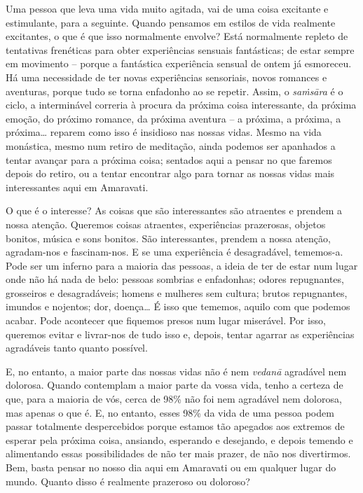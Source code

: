 Uma pessoa que leva uma vida muito agitada, vai de uma coisa excitante e
estimulante, para a seguinte. Quando pensamos em estilos de vida realmente
excitantes, o que é que isso normalmente envolve? Está normalmente repleto de
tentativas frenéticas para obter experiências sensuais fantásticas; de estar
sempre em movimento -- porque a fantástica experiência sensual de ontem já
esmoreceu. Há uma necessidade de ter novas experiências sensoriais, novos
romances e aventuras, porque tudo se torna enfadonho ao se repetir. Assim,
o \emph{saṁsāra} é o ciclo, a interminável correria à procura da próxima coisa
interessante, da próxima emoção, do próximo romance, da próxima aventura -- a
próxima, a próxima, a próxima\ldots{} reparem como isso é insidioso nas nossas
vidas. Mesmo na vida monástica, mesmo num retiro de meditação, ainda podemos ser
apanhados a tentar avançar para a próxima coisa; sentados aqui a pensar no que
faremos depois do retiro, ou a tentar encontrar algo para tornar as nossas vidas
mais interessantes aqui em Amaravati.

O que é o interesse? As coisas que são interessantes são atraentes e prendem a
nossa atenção. Queremos coisas atraentes, experiências prazerosas, objetos
bonitos, música e sons bonitos. São interessantes, prendem a nossa atenção,
agradam-nos e fascinam-nos. E se uma experiência é desagradável, tememos-a. %
Pode ser um inferno para a maioria das pessoas, a ideia de ter de estar num
lugar onde não há nada de belo: pessoas sombrias e enfadonhas; odores
repugnantes, grosseiros e desagradáveis; homens e mulheres sem cultura; brutos
repugnantes, imundos e nojentos; dor, doença\ldots{} É isso que tememos, aquilo
com que podemos acabar. Pode acontecer que fiquemos presos num lugar miserável.
Por isso, queremos evitar e livrar-nos de tudo isso e, depois, tentar agarrar
as experiências agradáveis tanto quanto possível.

E, no entanto, a maior parte das nossas vidas não é nem \emph{vedanā} agradável
nem dolorosa. Quando contemplam a maior parte da vossa vida, tenho a certeza de
que, para a maioria de vós, cerca de 98\% não foi nem agradável nem dolorosa,
mas apenas o que é. E, no entanto, esses 98\% da vida de uma pessoa podem passar
totalmente despercebidos porque estamos tão apegados aos extremos de esperar
pela próxima coisa, ansiando, esperando e desejando, e depois temendo e
alimentando essas possibilidades de não ter mais prazer, de não nos divertirmos.
Bem, basta pensar no nosso dia aqui em Amaravati ou em qualquer lugar do mundo.
Quanto disso é realmente prazeroso ou doloroso?

